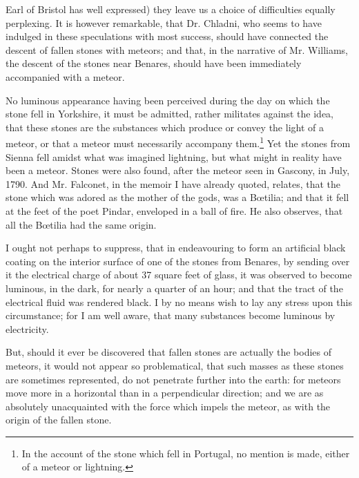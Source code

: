 \documentclass[a4paper, 12pt, oneside]{article}
\begin{document}
Earl of Bristol has well expressed) they leave us a choice of difficulties equally perplexing. It is however remarkable, that Dr. Chladni, who seems to have indulged in these speculations with most success, should have connected the descent of fallen stones with meteors; and that, in the narrative of Mr. Williams, the descent of the stones near Benares, should have been immediately accompanied with a meteor.

No luminous appearance having been perceived during the day on which the stone fell in Yorkshire, it must be admitted, rather militates against the idea, that these stones are the substances which produce or convey the light of a meteor, or that a meteor must necessarily accompany them.\footnote{In the account of the stone which fell in Portugal, no mention is made, either of a meteor or lightning.} Yet the stones from Sienna fell amidst what was imagined lightning, but what might in reality have been a meteor. Stones were also found, after the meteor seen in Gascony, in July, 1790. And Mr. Falconet, in the memoir I have already quoted, relates, that the stone which was adored as the mother of the gods, was a Bœtilia; and that it fell at the feet of the poet Pindar, enveloped in a ball of fire. He also observes, that all the Bœtilia had the same origin.

I ought not perhaps to suppress, that in endeavouring to form an artificial black coating on the interior surface of one of the stones from Benares, by sending over it the electrical charge of about 37 square feet of glass, it was observed to become luminous, in the dark, for nearly a quarter of an hour; and that the tract of the electrical fluid was rendered black. I by no means wish to lay any stress upon this circumstance; for I am well aware, that many substances become luminous by electricity.

But, should it ever be discovered that fallen stones are actually the bodies of meteors, it would not appear so problematical, that such masses as these stones are sometimes represented, do not penetrate further into the earth: for meteors move more in a horizontal than in a perpendicular direction; and we are as absolutely unacquainted with the force which impels the meteor, as with the origin of the fallen stone.
\end{document}
